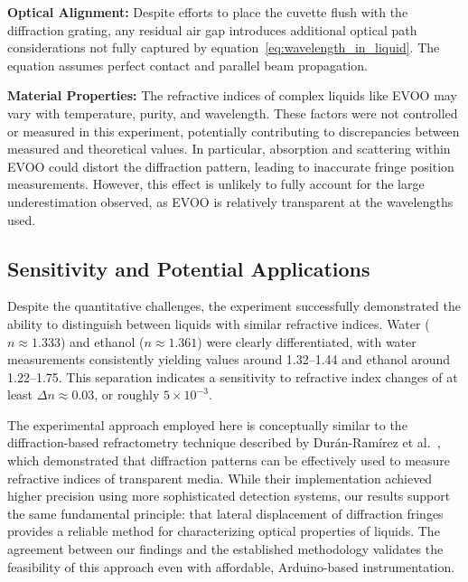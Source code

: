 \textbf{Optical Alignment:} Despite efforts to place the cuvette flush
with the diffraction grating, any residual air gap introduces
additional optical path considerations not fully captured by
equation~\eqref{eq:wavelength_in_liquid}.
The equation assumes perfect contact and parallel beam propagation.

\textbf{Material Properties:} The refractive indices of complex liquids
like EVOO may vary with temperature, purity, and wavelength.
These factors were not controlled or measured in this experiment,
potentially contributing to discrepancies between measured and
theoretical values.
In particular, absorption and scattering within EVOO could distort the
diffraction pattern, leading to inaccurate fringe position measurements.
However, this effect is unlikely to fully account for the large underestimation
observed, as EVOO is relatively transparent at the wavelengths used.

\subsection{Sensitivity and Potential Applications}
\label{subsec:sensitivity-and-potential-applications}

Despite the quantitative challenges, the experiment successfully
demonstrated the ability to distinguish between liquids with similar
refractive indices.
Water ($n \approx 1.333$) and ethanol ($n \approx 1.361$) were clearly
differentiated, with water measurements consistently yielding values
around 1.32--1.44 and ethanol around 1.22--1.75.
This separation indicates a sensitivity to refractive index changes of
at least $\Delta n \approx 0.03$, or roughly $5 \times 10^{-3}$.

The experimental approach employed here is conceptually similar to the
diffraction-based refractometry technique described by Durán-Ramírez
et al.~\cite{refractometry2014}, which demonstrated that diffraction
patterns can be effectively used to measure refractive indices of
transparent media.
While their implementation achieved higher precision using more
sophisticated detection systems, our results support the same
fundamental principle: that lateral displacement of diffraction fringes
provides a reliable method for characterizing optical properties of
liquids.
The agreement between our findings and the established methodology
validates the feasibility of this approach even with affordable,
Arduino-based instrumentation.

